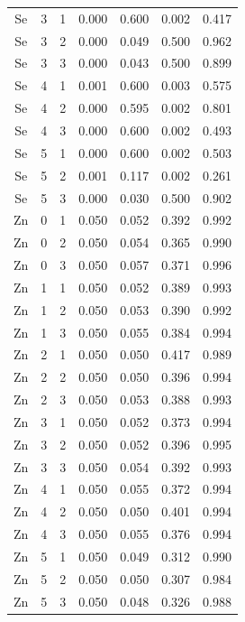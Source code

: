 \documentclass[ms, hidelinks]{uncgdissertationexp}
\theoremstyle{plain}
\theoremstyle{definition}
\theoremstyle{remark}
\begin{document}
\begin{longtable}{ccccccc}
Se & 3 & 1 & 0.000 & 0.600 & 0.002 & 0.417\\
\rowcolor{gray!6}  Se & 3 & 2 & 0.000 & 0.049 & 0.500 & 0.962\\
Se & 3 & 3 & 0.000 & 0.043 & 0.500 & 0.899\\
\rowcolor{gray!6}  Se & 4 & 1 & 0.001 & 0.600 & 0.003 & 0.575\\
Se & 4 & 2 & 0.000 & 0.595 & 0.002 & 0.801\\
\rowcolor{gray!6}  Se & 4 & 3 & 0.000 & 0.600 & 0.002 & 0.493\\
Se & 5 & 1 & 0.000 & 0.600 & 0.002 & 0.503\\
\rowcolor{gray!6}  Se & 5 & 2 & 0.001 & 0.117 & 0.002 & 0.261\\
Se & 5 & 3 & 0.000 & 0.030 & 0.500 & 0.902\\
\rowcolor{gray!6}  Zn & 0 & 1 & 0.050 & 0.052 & 0.392 & 0.992\\
Zn & 0 & 2 & 0.050 & 0.054 & 0.365 & 0.990\\
\rowcolor{gray!6}  Zn & 0 & 3 & 0.050 & 0.057 & 0.371 & 0.996\\
Zn & 1 & 1 & 0.050 & 0.052 & 0.389 & 0.993\\
\rowcolor{gray!6}  Zn & 1 & 2 & 0.050 & 0.053 & 0.390 & 0.992\\
Zn & 1 & 3 & 0.050 & 0.055 & 0.384 & 0.994\\
\rowcolor{gray!6}  Zn & 2 & 1 & 0.050 & 0.050 & 0.417 & 0.989\\
Zn & 2 & 2 & 0.050 & 0.050 & 0.396 & 0.994\\
\rowcolor{gray!6}  Zn & 2 & 3 & 0.050 & 0.053 & 0.388 & 0.993\\
Zn & 3 & 1 & 0.050 & 0.052 & 0.373 & 0.994\\
\rowcolor{gray!6}  Zn & 3 & 2 & 0.050 & 0.052 & 0.396 & 0.995\\
Zn & 3 & 3 & 0.050 & 0.054 & 0.392 & 0.993\\
\rowcolor{gray!6}  Zn & 4 & 1 & 0.050 & 0.055 & 0.372 & 0.994\\
Zn & 4 & 2 & 0.050 & 0.050 & 0.401 & 0.994\\
\rowcolor{gray!6}  Zn & 4 & 3 & 0.050 & 0.055 & 0.376 & 0.994\\
Zn & 5 & 1 & 0.050 & 0.049 & 0.312 & 0.990\\
\rowcolor{gray!6}  Zn & 5 & 2 & 0.050 & 0.050 & 0.307 & 0.984\\
Zn & 5 & 3 & 0.050 & 0.048 & 0.326 & 0.988\\*
\end{longtable}
\clearpage
\end{document}
